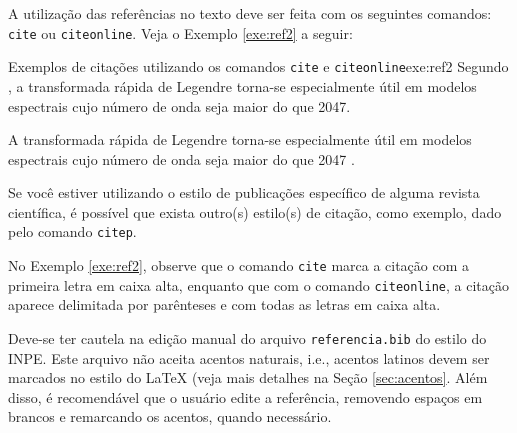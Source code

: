A utilização das referências no texto deve ser feita com os seguintes comandos: {\tt cite} ou {\tt citeonline}. Veja o Exemplo \ref{exe:ref2} a seguir:

\begin{texexptitled}[breakable,center lower,enhanced,middle=2mm]{Exemplos de citações utilizando os comandos {\tt cite} e {\tt citeonline}}{exe:ref2}
Segundo , a transformada rápida de Legendre torna-se especialmente útil em modelos espectrais cujo número de onda seja maior do que 2047.

A transformada rápida de Legendre torna-se especialmente útil em modelos espectrais cujo número de onda seja maior do que 2047 \cite{wedietal/2013}.
\end{texexptitled}

\begin{marker}
  Se você estiver utilizando o estilo de publicações específico de alguma revista científica, é possível que exista outro(s) estilo(s) de citação, como exemplo, dado pelo comando {\tt citep}.
\end{marker}

No Exemplo \ref{exe:ref2}, observe que o comando {\tt cite} marca a citação com a primeira letra em caixa alta, enquanto que com o comando {\tt citeonline}, a citação aparece delimitada por parênteses e com todas as letras em caixa alta. 


%
%
%
%
%
%
%
%

\begin{marker}
  Deve-se ter cautela na edição manual do arquivo {\tt referencia.bib} do estilo do INPE. Este arquivo não aceita acentos naturais, i.e., acentos latinos devem ser marcados no estilo do \LaTeX{} (veja mais detalhes na Seção \ref{sec:acentos}. Além disso, é recomendável que o usuário edite a referência, removendo espaços em brancos e remarcando os acentos, quando necessário.
\end{marker}

